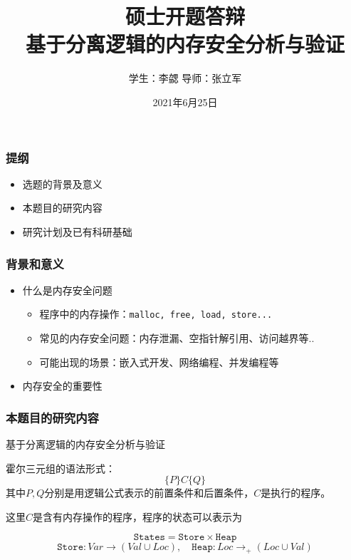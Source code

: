 \documentclass[aspectratio=1610, 11pt]{beamer}
\title{硕士开题答辩\\基于分离逻辑的内存安全分析与验证}
\date{2021年6月25日}
\author{学生：李勰 \qquad 导师：张立军}
\begin{document}
\maketitle

\begin{frame}\frametitle{提纲}
\begin{itemize}
\item 选题的背景及意义
\item 本题目的研究内容
\item 研究计划及已有科研基础
\end{itemize}
\end{frame}
\begin{frame}\frametitle{背景和意义}
\begin{itemize}
\item 什么是内存安全问题

\begin{itemize}
\item 程序中的内存操作：\texttt{malloc, free, load, store...}
\item 
常见的内存安全问题：内存泄漏、空指针解引用、访问越界等..
\item 可能出现的场景：嵌入式开发、网络编程、并发编程等
\end{itemize}


\item 内存安全的重要性

\end{itemize}
\end{frame}

\begin{frame}\frametitle{本题目的研究内容}
\begin{center}
基于分离逻辑的内存安全分析与验证
\end{center}
\pause

\begin{definition}[霍尔三元组]
霍尔三元组的语法形式：
\[\{P\}C\{Q\}\]
其中$P,Q$分别是用逻辑公式表示的前置条件和后置条件，$C$是执行的程序。
\end{definition}

\pause
这里$C$是含有内存操作的程序，程序的状态可以表示为

\[\texttt{States} = \texttt{Store}\times \texttt{Heap}\]
\[\texttt{Store}: Var \rightarrow (Val \cup Loc), \quad \texttt{Heap}: Loc \rightarrow_+ (Loc \cup Val)\]


\end{frame}
\end{document}
